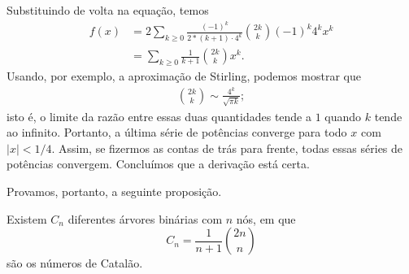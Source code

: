 Substituindo de volta na equação, temos
\begin{align*}
    f(x) &= 2\sum_{k \geq 0}
        \frac{(-1)^k}{2*(k+1) \cdot 4^k} \binom{2k}{k} (-1)^k 4^k x^k \\
        &= \sum_{k \geq 0} \frac 1 {k+1} \binom{2k} k x^k.
\end{align*}
Usando, por exemplo,
a aproximação de Stirling,
podemos mostrar que
\begin{align*}
    \binom{2k} k \sim \frac{4^k}{\sqrt{\pi k}};
\end{align*}
isto é, o limite da razão entre essas duas quantidades tende a $1$
quando $k$ tende ao infinito.
Portanto, a última série de potências converge para todo $x$ com $|x| < 1/4$.
Assim, se fizermos as contas de trás para frente,
todas essas séries de potências convergem.
Concluímos que a derivação está certa.

Provamos, portanto, a seguinte proposição.
\begin{proposition}
    Existem $C_n$ diferentes árvores binárias com $n$ nós,
    em que
    \begin{equation}
        C_n = \frac{1}{n + 1} \binom{2n}{n}
        \label{eq:catalan}
    \end{equation}
    são os números de Catalão.
\end{proposition}
